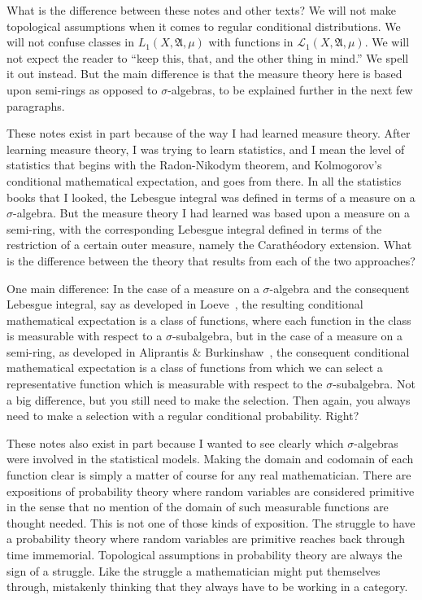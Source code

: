 \documentclass[
twoside=true,
paper=letter,
fontsize=11pt,
pagesize=auto,
leqno,
openany,
headsepline,
overfullrule,
]{scrbook}
\theoremstyle{plain}
\theoremstyle{plain}
\theoremstyle{definition}
\theoremstyle{bfnoteitalic}
\theoremstyle{bfnoteroman}
\newcommand{\sigalg}[1]{\mathfrak{#1}}
\newcommand{\cali}[1]{\mathscr{#1}}
\newcommand{\textsigma}{\hbox{\large{$\sigma$}}\kern-1pt}
\newcommand{\sigmaalgebra}{\sigalg{A}}
\newcommand{\Lone}{L_1(\measurespace, \sigmaalgebra, \measure)}
\newcommand{\measurespace}{X}
\newcommand{\measure}{\mu}
\newcommand{\measmu}{\mu}
\begin{document}
What is the difference between these notes and other texts?
We will not make topological assumptions when it comes to regular conditional distributions.
We will not confuse classes in $\Lone$ with functions in
$\cali{L}_1(\measurespace,\sigmaalgebra, \measmu)$.
We will not expect the reader to ``keep this, that, and the other thing in mind.'' We spell it out instead. But the main difference is that the measure theory here is based upon semi-rings as opposed to \textsigma\hyp{}algebras, to be explained further in the next few paragraphs.


These notes exist in part because of the way I had learned measure theory. After learning measure theory, I was trying to learn statistics, and I mean the level of statistics that begins with the Radon-Nikodym theorem, and  Kolmogorov's conditional mathematical expectation, and goes from there. In all  the statistics books that I looked, the Lebesgue integral was defined in terms of a measure on a  \textsigma\hyp{}algebra.
But the measure theory I had learned was based upon a measure on a  semi-ring, with the corresponding Lebesgue integral defined in terms of the restriction of a certain outer measure, namely the Carath\'{e}odory extension.
What is the difference between the theory that results from each of the two approaches?

One main difference: In the case of a measure on a  \textsigma\hyp{}algebra and the consequent Lebesgue integral, say as developed in Loeve~\cite{pt_loeve_1960}, the resulting conditional mathematical expectation is a class of functions, where each function in the class is measurable with respect to a
\textsigma\hyp{}subalgebra, but in the case of a measure on a semi-ring, as developed in Aliprantis \& Burkinshaw~\cite{pora_aliprantis_1990}, the consequent conditional mathematical expectation is a class of functions from which we can select a representative function which is measurable with respect to the  \textsigma\hyp{}subalgebra.  Not a big difference, but you still need to make the selection. Then again, you always need to make a selection with a regular conditional probability. Right?



These notes also exist in part because I wanted to see clearly which \textsigma\hyp{}algebras were involved in the statistical models. Making the domain and codomain of each function clear is simply a matter of course for any real mathematician.  There are expositions of probability theory where random variables are considered primitive in the sense that no mention of the domain of such measurable functions are thought needed.  This is not one of those kinds of exposition.
The struggle to have a probability theory where random variables are primitive reaches back through time immemorial.
Topological assumptions in probability theory are always the sign of a struggle.
Like the struggle a mathematician might put themselves through, mistakenly thinking that they always have to be working in a category.
\end{document}
